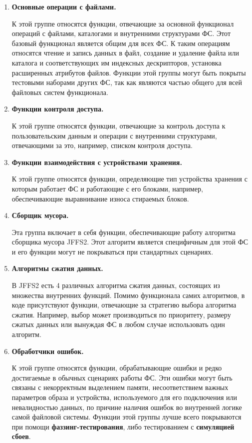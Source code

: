 \begin{enumerate}
	\item \textbf{Основные операции с файлами.}

	К этой группе относятся функции, отвечающие за основной функционал операций с файлами, каталогами и внутренними структурами  ФС. Этот базовый функционал является общим для всех ФС. К таким операциям относятся чтение и запись данных в файл, создание и удаление файла или каталога и соответствующих им индексных дескрипторов, установка расширенных атрибутов файлов. Функции этой группы могут быть покрыты тестовыми наборами других ФС, так как являются частью общего для всей файловых систем функционала.

	\item \textbf{Функции контроля доступа.}

	К этой группе относятся функции, отвечающие за контроль доступа к пользовательским данным и операции с внутренними структурами, отвечающими за это, например, списком контроля доступа.

	\item \textbf{Функции взаимодействия с устройствами хранения.}

	К этой группе относятся функции, определяющие тип устройства хранения с которым работает ФС и работающие с его блоками, например, обеспечивающие выравнивание износа стираемых блоков.

	\item \textbf{Сборщик мусора.}

	Эта группа включает в себя функции, обеспечивающие работу алгоритма сборщика мусора JFFS2. Этот алгоритм является специфичным для этой ФС и его функции могут не покрываться при стандартных сценариях.

	\item \textbf{Алгоритмы сжатия данных.}

	В JFFS2 есть 4 различных алгоритма сжатия данных, состоящих из множества внутренних функций. Помимо функционала самих алгоритмов, в коде присутствуют функции, отвечающие за стратегию выбора алгоритма сжатия. Например, выбор может производиться по приоритету, размеру сжатых данных или вынуждая ФС в любом случае использовать один алгоритм.

	\item \textbf{Обработчики ошибок.}

	К этой группе относятся функции, обрабатывающие ошибки и редко достигаемые в обычных сценариях работы ФС. Эти ошибки могут быть связаны с некорректным выделением памяти, несоответствием важных параметров образа и устройства, используемого для его подключения или невалидностью данных, по причине наличия ошибок во внутренней логике самой файловой системы. Функции этой группы лучше всего покрываются при помощи \textbf{фаззинг-тестирования}, либо тестированием с \textbf{симуляцией сбоев}.


\end{enumerate}
